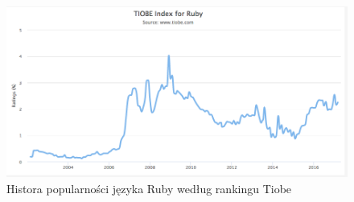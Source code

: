                                                                     



                                                                     



                                                                     



                                                                     



                                                                     



                                                                     



                                                                     




                                                                     




                                                                     




\begin{figure}[H]
  \centering
  \includegraphics[width=1\linewidth]{pictures/ruby_tiobe}
  \caption{Histora popularności języka Ruby według rankingu Tiobe}
  \label{fig:ruby_tiobe}
\end{figure}


                                                                     




                                                                     





